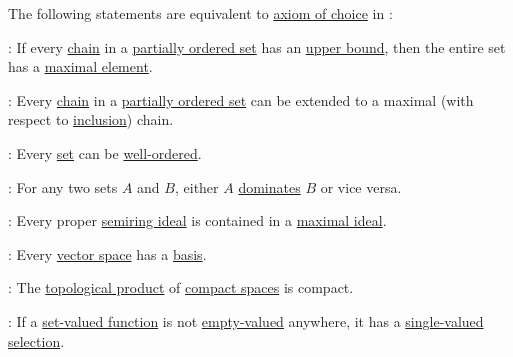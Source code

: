 \begin{theorem}\label{thm:axiom_of_choice_equivalences}
  The following statements are equivalent to \hyperref[def:zfc/choice]{axiom of choice} in \hyperref[def:zfc]{}:
  \begin{thmenum}[resume=thm:axiom_of_choice_equivalences]
     : If every \hyperref[def:partial_order_connectedness]{chain} in a \hyperref[def:partially_ordered_set]{partially ordered set} has an \hyperref[def:extremal_points/bounds]{upper bound}, then the entire set has a \hyperref[def:extremal_points/maximal_and_minimal_element]{maximal element}.

     : Every \hyperref[def:partial_order_connectedness/chain]{chain} in a \hyperref[def:partially_ordered_set]{partially ordered set} can be extended to a maximal (with respect to \hyperref[def:inclusion_order]{inclusion}) chain.

     : Every \hyperref[def:set]{set} can be \hyperref[def:well_ordered_set]{well-ordered}.

     : For any two sets \( A \) and \( B \), either \( A \) \hyperref[def:set_domination]{dominates} \( B \) or vice versa.

     : Every proper \hyperref[def:semiring_ideal]{semiring ideal} is contained in a \hyperref[def:semiring_ideal/maximal]{maximal ideal}.

     : Every \hyperref[def:vector_space]{vector space} has a \hyperref[def:hamel_basis]{basis}.

     : The \hyperref[def:topological_product]{topological product} of \hyperref[def:compact_space]{compact spaces} is compact.

     : If a \hyperref[def:set_valued_function]{set-valued function} is not \hyperref[def:set_valued_function/value_cardinality/empty]{empty-valued} anywhere, it has a \hyperref[def:set_valued_selection]{single-valued selection}.


\end{thmenum}
\end{theorem}
